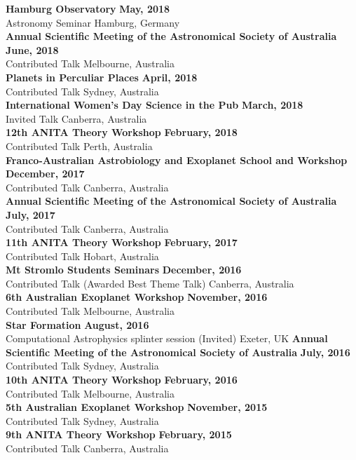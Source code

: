 \documentclass[margin,line]{res}
\begin{document}
\begin{resume}
		{\bf Hamburg Observatory} \hfill {\bf May, 2018}\\
		Astronomy Seminar \hfill Hamburg, Germany\\
		{\bf Annual Scientific Meeting of the Astronomical Society of Australia} \hfill {\bf June, 2018}\\
		Contributed Talk \hfill Melbourne, Australia\\
		{\bf Planets in Perculiar Places} \hfill {\bf April, 2018}\\
		Contributed Talk \hfill Sydney, Australia\\
		{\bf International Women's Day Science in the Pub} \hfill {\bf March, 2018}\\
		Invited Talk \hfill Canberra, Australia\\
		{\bf 12th ANITA Theory Workshop} \hfill {\bf February, 2018}\\
		Contributed Talk \hfill Perth, Australia\\
		{\bf Franco-Australian Astrobiology and Exoplanet School and Workshop} \hfill {\bf December, 2017}\\
		Contributed Talk \hfill Canberra, Australia\\
		{\bf Annual Scientific Meeting of the Astronomical Society of Australia} \hfill {\bf July, 2017}\\
		Contributed Talk \hfill Canberra, Australia\\
		{\bf 11th ANITA Theory Workshop} \hfill {\bf February, 2017}\\
		Contributed Talk \hfill Hobart, Australia\\
		{\bf Mt Stromlo Students Seminars} \hfill {\bf December, 2016}\\
		Contributed Talk (Awarded Best Theme Talk) \hfill Canberra, Australia\\
		{\bf 6th Australian Exoplanet Workshop} \hfill {\bf November, 2016}\\
		Contributed Talk \hfill Melbourne, Australia\\
		{\bf Star Formation} \hfill {\bf August, 2016}\\
		Computational Astrophysics splinter session (Invited) \hfill Exeter, UK
		{\bf Annual Scientific Meeting of the Astronomical Society of Australia} \hfill {\bf July, 2016}\\
		Contributed Talk \hfill Sydney, Australia\\
		{\bf 10th ANITA Theory Workshop} \hfill {\bf February, 2016}\\
		Contributed Talk \hfill Melbourne, Australia\\
		{\bf 5th Australian Exoplanet Workshop} \hfill {\bf November, 2015}\\
		Contributed Talk \hfill Sydney, Australia\\
		{\bf 9th ANITA Theory Workshop} \hfill {\bf February, 2015}\\
		Contributed Talk \hfill Canberra, Australia\\
		

\end{resume}
\end{document}
